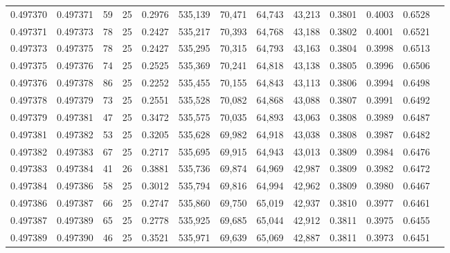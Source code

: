 \begin{tabular}{rrrrrrrrrrrrr}
0.497370 & 0.497371 &    59 &  25 &                                     0.2976 & 535,139 &  70,471 &  64,743 &  43,213 & 0.3801 & 0.4003 & 0.6528 \\
0.497371 & 0.497373 &    78 &  25 &                                     0.2427 & 535,217 &  70,393 &  64,768 &  43,188 & 0.3802 & 0.4001 & 0.6521 \\
0.497373 & 0.497375 &    78 &  25 &                                     0.2427 & 535,295 &  70,315 &  64,793 &  43,163 & 0.3804 & 0.3998 & 0.6513 \\
0.497375 & 0.497376 &    74 &  25 &                                     0.2525 & 535,369 &  70,241 &  64,818 &  43,138 & 0.3805 & 0.3996 & 0.6506 \\
0.497376 & 0.497378 &    86 &  25 &                                     0.2252 & 535,455 &  70,155 &  64,843 &  43,113 & 0.3806 & 0.3994 & 0.6498 \\
0.497378 & 0.497379 &    73 &  25 &                                     0.2551 & 535,528 &  70,082 &  64,868 &  43,088 & 0.3807 & 0.3991 & 0.6492 \\
0.497379 & 0.497381 &    47 &  25 &                                     0.3472 & 535,575 &  70,035 &  64,893 &  43,063 & 0.3808 & 0.3989 & 0.6487 \\
0.497381 & 0.497382 &    53 &  25 &                                     0.3205 & 535,628 &  69,982 &  64,918 &  43,038 & 0.3808 & 0.3987 & 0.6482 \\
0.497382 & 0.497383 &    67 &  25 &                                     0.2717 & 535,695 &  69,915 &  64,943 &  43,013 & 0.3809 & 0.3984 & 0.6476 \\
0.497383 & 0.497384 &    41 &  26 &                                     0.3881 & 535,736 &  69,874 &  64,969 &  42,987 & 0.3809 & 0.3982 & 0.6472 \\
0.497384 & 0.497386 &    58 &  25 &                                     0.3012 & 535,794 &  69,816 &  64,994 &  42,962 & 0.3809 & 0.3980 & 0.6467 \\
0.497386 & 0.497387 &    66 &  25 &                                     0.2747 & 535,860 &  69,750 &  65,019 &  42,937 & 0.3810 & 0.3977 & 0.6461 \\
0.497387 & 0.497389 &    65 &  25 &                                     0.2778 & 535,925 &  69,685 &  65,044 &  42,912 & 0.3811 & 0.3975 & 0.6455 \\
0.497389 & 0.497390 &    46 &  25 &                                     0.3521 & 535,971 &  69,639 &  65,069 &  42,887 & 0.3811 & 0.3973 & 0.6451 \\

\end{tabular}
